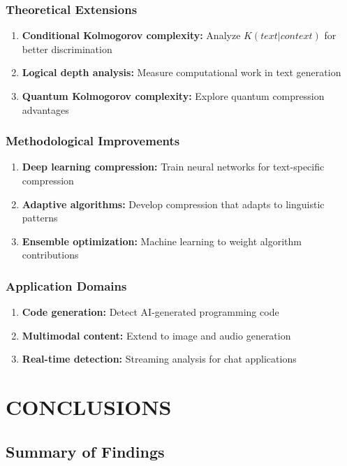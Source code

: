 \documentclass[12pt,a4paper]{report}
\begin{document}
\subsection{Theoretical Extensions}

\begin{enumerate}
    \item \textbf{Conditional Kolmogorov complexity:} Analyze $K(text|context)$ for better discrimination
    \item \textbf{Logical depth analysis:} Measure computational work in text generation
    \item \textbf{Quantum Kolmogorov complexity:} Explore quantum compression advantages
\end{enumerate}

\subsection{Methodological Improvements}

\begin{enumerate}
    \item \textbf{Deep learning compression:} Train neural networks for text-specific compression
    \item \textbf{Adaptive algorithms:} Develop compression that adapts to linguistic patterns
    \item \textbf{Ensemble optimization:} Machine learning to weight algorithm contributions
\end{enumerate}

\subsection{Application Domains}

\begin{enumerate}
    \item \textbf{Code generation:} Detect AI-generated programming code
    \item \textbf{Multimodal content:} Extend to image and audio generation
    \item \textbf{Real-time detection:} Streaming analysis for chat applications
\end{enumerate}


\chapter{CONCLUSIONS}

\section{Summary of Findings}
\end{document}
